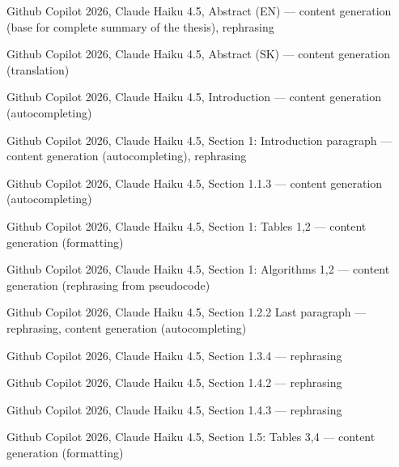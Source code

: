 \begin{trivlist}

\item Github Copilot 2026, Claude Haiku 4.5, Abstract (EN) ---
    content generation (base for complete summary of the thesis), rephrasing
\item Github Copilot 2026, Claude Haiku 4.5, Abstract (SK) ---
    content generation (translation)

\item Github Copilot 2026, Claude Haiku 4.5, Introduction ---
    content generation (autocompleting)

\item Github Copilot 2026, Claude Haiku 4.5, Section 1: Introduction paragraph ---
    content generation (autocompleting), rephrasing

\item Github Copilot 2026, Claude Haiku 4.5, Section 1.1.3 ---
    content generation (autocompleting)

\item Github Copilot 2026, Claude Haiku 4.5, Section 1: Tables 1,2 ---
    content generation (formatting)

\item Github Copilot 2026, Claude Haiku 4.5, Section 1: Algorithms 1,2 ---
    content generation (rephrasing from pseudocode)

\item Github Copilot 2026, Claude Haiku 4.5, Section 1.2.2 Last paragraph ---
    rephrasing, content generation (autocompleting)

\item Github Copilot 2026, Claude Haiku 4.5, Section 1.3.4 ---
    rephrasing

\item Github Copilot 2026, Claude Haiku 4.5, Section 1.4.2 ---
    rephrasing

\item Github Copilot 2026, Claude Haiku 4.5, Section 1.4.3 ---
    rephrasing

\item Github Copilot 2026, Claude Haiku 4.5, Section 1.5: Tables 3,4 ---
    content generation (formatting)


\end{trivlist}
